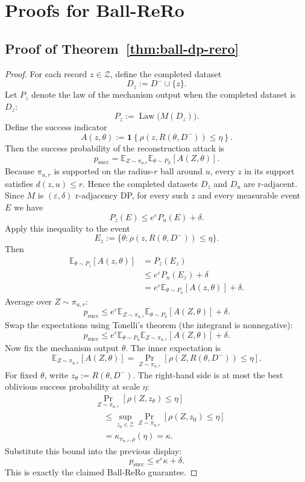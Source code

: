 \documentclass[11pt,a4paper]{report}
\theoremstyle{plain}
\theoremstyle{definition}
\theoremstyle{remark}
\DeclareMathOperator{\Law}{Law}
\newcommand{\ind}[1]{\mathbf{1}\!\left\{#1\right\}}
\begin{document}
\section{Proofs for Ball-ReRo}
\label{app:proof-ball-rero}

\subsection{Proof of Theorem~\ref{thm:ball-dp-rero}}

\begin{proof}
For each record $z\in\mathcal{Z}$, define the completed dataset
\[
D_z:=D^-\cup\{z\}.
\]
Let $P_z$ denote the law of the mechanism output when the completed dataset is $D_z$:
\[
P_z:=\Law\big(M(D_z)\big).
\]
Define the success indicator
\[
A(z,\theta):=\ind{\rho(z,R(\theta,D^-))\le \eta}.
\]
Then the success probability of the reconstruction attack is
\[
p_{\mathrm{succ}}
=
\mathbb{E}_{Z\sim\pi_{u,r}}
\mathbb{E}_{\theta\sim P_Z}[A(Z,\theta)].
\]
Because $\pi_{u,r}$ is supported on the radius-$r$ ball around $u$, every $z$ in its support satisfies $d(z,u)\le r$. Hence the completed datasets $D_z$ and $D_u$ are r-adjacent. Since $M$ is $(\varepsilon,\delta)$ r-adjacency DP, for every such $z$ and every measurable event $E$ we have
\[
P_z(E)\le e^{\varepsilon}P_u(E)+\delta.
\]
Apply this inequality to the event
\[
E_z:=\{\theta: \rho(z,R(\theta,D^-))\le \eta\}.
\]
Then
\[
\begin{aligned}
\mathbb{E}_{\theta\sim P_z}[A(z,\theta)]
&= P_z(E_z) \\
&\le e^{\varepsilon} P_u(E_z) + \delta \\
&= e^{\varepsilon}
   \mathbb{E}_{\theta\sim P_u}[A(z,\theta)]
   + \delta .
\end{aligned}
\]
Average over $Z\sim\pi_{u,r}$:
\[
p_{\mathrm{succ}}
\le
 e^{\varepsilon}
\mathbb{E}_{Z\sim\pi_{u,r}}
\mathbb{E}_{\theta\sim P_u}[A(Z,\theta)]
+\delta.
\]
Swap the expectations using Tonelli's theorem (the integrand is nonnegative):
\[
p_{\mathrm{succ}}
\le
 e^{\varepsilon}
\mathbb{E}_{\theta\sim P_u}
\mathbb{E}_{Z\sim\pi_{u,r}}[A(Z,\theta)]
+\delta.
\]
Now fix the mechanism output $\theta$. The inner expectation is
\[
\mathbb{E}_{Z\sim\pi_{u,r}}[A(Z,\theta)]
=
\Pr_{Z\sim\pi_{u,r}}[\rho(Z,R(\theta,D^-))\le \eta].
\]
For fixed $\theta$, write $z_\theta:=R(\theta,D^-)$. The right-hand
side is at most the best oblivious success probability at scale $\eta$:
\[
\begin{aligned}
&\Pr_{Z\sim\pi_{u,r}}
   [\rho(Z,z_\theta)\le \eta] \\
&\quad\le
\sup_{z_0\in\mathcal{Z}}
\Pr_{Z\sim\pi_{u,r}}[\rho(Z,z_0)\le \eta] \\
&\quad=
\kappa_{\pi_{u,r},\rho}(\eta)
=
\kappa.
\end{aligned}
\]
Substitute this bound into the previous display:
\[
p_{\mathrm{succ}}\le e^{\varepsilon}\kappa+\delta.
\]
This is exactly the claimed Ball-ReRo guarantee.
\end{proof}
\end{document}
